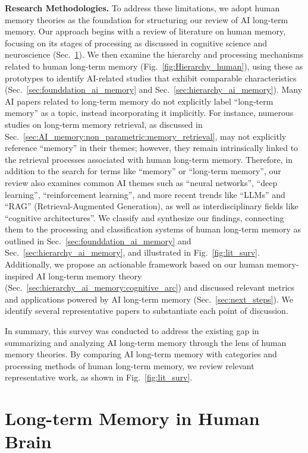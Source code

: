 \documentclass[journal,hideappendix]{vgtc}
\begin{document}
\noindent\textbf{Research Methodologies.} To address these limitations, we adopt human memory theories as the foundation for structuring our review of AI long-term memory. 
  Our approach begins with a review of literature on human memory, focusing on its stages of processing as discussed in cognitive science and neuroscience (Sec.~\ref{sec:human_memory}). We then examine the hierarchy and processing mechanisms related to human long-term memory (Fig.~\ref{fig:Hierarchy_human}), using these as prototypes to identify AI-related studies that exhibit comparable characteristics (Sec.~\ref{sec:founddation_ai_memory} and Sec.~\ref{sec:hierarchy_ai_memory}).
  Many AI papers related to long-term memory do not explicitly label ``long-term memory'' as a topic, instead incorporating it implicitly. For instance, numerous studies on long-term memory retrieval, as discussed in Sec.~\ref{sec:AI_memory:non_parametric:memory_retrieval}, may not explicitly reference ``memory'' in their themes; however, they remain intrinsically linked to the retrieval processes associated with human long-term memory. Therefore, in addition to the search for terms like ``memory'' or ``long-term memory'', our review also examines common AI themes such as ``neural networks'', ``deep learning'', ``reinforcement learning'', and more recent trends like ``LLMs'' and ``RAG'' (Retrieval-Augmented Generation), as well as interdisciplinary fields like ``cognitive architectures''. We classify and synthesize our findings, connecting them to the processing and classification systems of human long-term memory as outlined in Sec.~\ref{sec:founddation_ai_memory} and Sec.~\ref{sec:hierarchy_ai_memory}, and illustrated in Fig.~\ref{fig:lit_surv}. Additionally, we propose an actionable framework based on our human memory-inspired AI long-term memory theory (Sec.~\ref{sec:hierarchy_ai_memory:cognitive_arc}) and discussed relevant metrics and applications powered by AI long-term memory (Sec.~\ref{sec:next_steps}). We identify several representative papers to substantiate each point of discussion.


In summary, this survey was conducted to address the existing gap in summarizing and analyzing AI long-term memory through the lens of human memory theories. By comparing AI long-term memory with categories and processing methods of human long-term memory, we review relevant representative work, as shown in Fig.~\ref{fig:lit_surv}.

\section{Long-term Memory in Human Brain}
\label{sec:human_memory}
\end{document}
